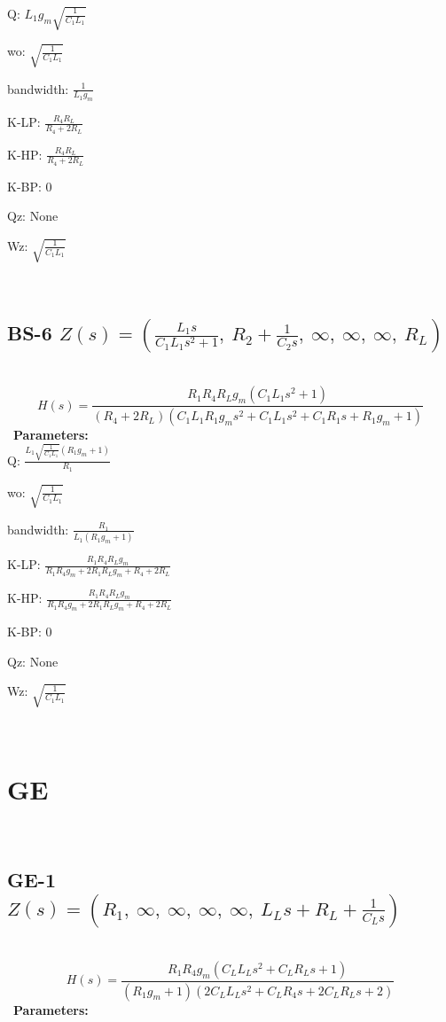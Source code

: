 \documentclass{article}
\begin{document}
Q: $L_{1} g_{m} \sqrt{\frac{1}{C_{1} L_{1}}}$\ 

wo: $\sqrt{\frac{1}{C_{1} L_{1}}}$\ 

bandwidth: $\frac{1}{L_{1} g_{m}}$\ 

K-LP: $\frac{R_{4} R_{L}}{R_{4} + 2 R_{L}}$\ 

K-HP: $\frac{R_{4} R_{L}}{R_{4} + 2 R_{L}}$\ 

K-BP: $0$\ 

Qz: $\text{None}$\ 

Wz: $\sqrt{\frac{1}{C_{1} L_{1}}}$\ 

\ 

\subsection{BS-6 $Z(s) = \left( \frac{L_{1} s}{C_{1} L_{1} s^{2} + 1}, \  R_{2} + \frac{1}{C_{2} s}, \  \infty, \  \infty, \  \infty, \  R_{L}\right)$ } \ 
\textbf{\[H(s) = \frac{R_{1} R_{4} R_{L} g_{m} \left(C_{1} L_{1} s^{2} + 1\right)}{\left(R_{4} + 2 R_{L}\right) \left(C_{1} L_{1} R_{1} g_{m} s^{2} + C_{1} L_{1} s^{2} + C_{1} R_{1} s + R_{1} g_{m} + 1\right)}\] } \ 
\textbf{Parameters:}\\ 

Q: $\frac{L_{1} \sqrt{\frac{1}{C_{1} L_{1}}} \left(R_{1} g_{m} + 1\right)}{R_{1}}$\ 

wo: $\sqrt{\frac{1}{C_{1} L_{1}}}$\ 

bandwidth: $\frac{R_{1}}{L_{1} \left(R_{1} g_{m} + 1\right)}$\ 

K-LP: $\frac{R_{1} R_{4} R_{L} g_{m}}{R_{1} R_{4} g_{m} + 2 R_{1} R_{L} g_{m} + R_{4} + 2 R_{L}}$\ 

K-HP: $\frac{R_{1} R_{4} R_{L} g_{m}}{R_{1} R_{4} g_{m} + 2 R_{1} R_{L} g_{m} + R_{4} + 2 R_{L}}$\ 

K-BP: $0$\ 

Qz: $\text{None}$\ 

Wz: $\sqrt{\frac{1}{C_{1} L_{1}}}$\ 

\ 

\section{GE}\ 
\subsection{GE-1 $Z(s) = \left( R_{1}, \  \infty, \  \infty, \  \infty, \  \infty, \  L_{L} s + R_{L} + \frac{1}{C_{L} s}\right)$ } \ 
\textbf{\[H(s) = \frac{R_{1} R_{4} g_{m} \left(C_{L} L_{L} s^{2} + C_{L} R_{L} s + 1\right)}{\left(R_{1} g_{m} + 1\right) \left(2 C_{L} L_{L} s^{2} + C_{L} R_{4} s + 2 C_{L} R_{L} s + 2\right)}\] } \ 
\textbf{Parameters:}\\ 
\end{document}
